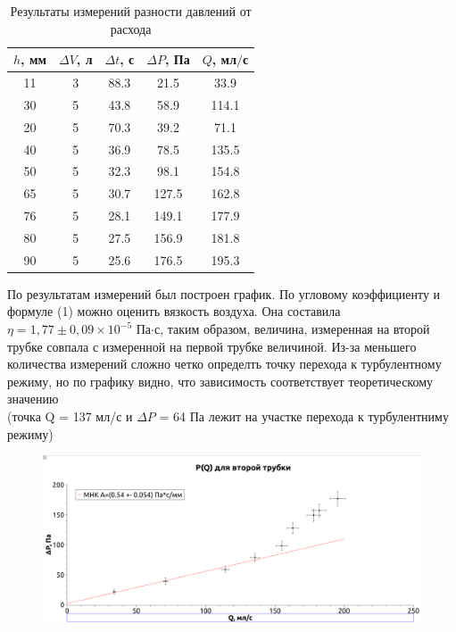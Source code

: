 \documentclass[a4paper, 12pt]{article}
\begin{document}
\begin{table}[H]
    \centering
    \begin{tabular}{|c|c|c|c|c|}
        \hline $h$, мм & $\Delta V$, л & $\Delta t$, с & $\Delta P$, Па & $Q$, мл$/$с \\
        \hline 11 & 3 & 88.3 & 21.5 & 33.9 \\ \hline
        30 & 5 & 43.8 & 58.9 & 114.1 \\ \hline
        20 & 5 & 70.3 & 39.2 & 71.1 \\ \hline
        40 & 5 & 36.9 & 78.5 & 135.5 \\ \hline
        50 & 5 & 32.3 & 98.1 & 154.8 \\ \hline
        65 & 5 & 30.7 & 127.5 & 162.8 \\ \hline
        76 & 5 & 28.1 & 149.1 & 177.9 \\ \hline
        80 & 5 & 27.5 & 156.9 & 181.8 \\ \hline
        90 & 5 & 25.6 & 176.5 & 195.3 \\ \hline
    \end{tabular}
    \caption{Результаты измерений разности давлений от расхода}
    \label{tab:q(p)}
\end{table}
По результатам измерений был построен график. По угловому коэффициенту и формуле (1) можно оценить вязкость воздуха. Она составила $\eta = 1,77 \pm 0,09 \times 10^{-5}$ Па$\cdot$с, таким образом, величина, измеренная на второй трубке совпала с измеренной на первой трубке величиной. Из-за меньшего количества измерений сложно четко определть точку перехода к турбулентному режиму, но по графику видно, что зависимость соответствует теоретическому значению \\ 
(точка Q = 137 мл/с и $\Delta P$ = 64 Па лежит на участке перехода к турбулентниму режиму) 
\begin{figure}[H]
    \centering
    \includegraphics[scale=0.25]{chart2.png}
    \label{p(q)}
\end{figure}
\end{document}
